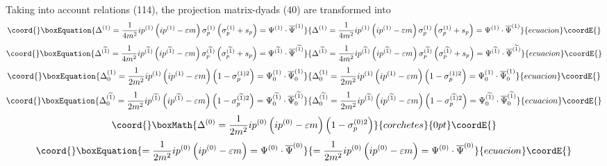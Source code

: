 \documentclass[a4paper,12pt]{article}
\begin{document}
Taking into account relations (114), the projection matrix-dyads (40) are
transformed into
\begin{equation}\coord{}\boxEquation{
\Delta ^{(1)}=\frac 1{4m^2}ip^{(1)}\left( ip^{(1)}-\varepsilon
m\right) \sigma _p^{(1)}\left( \sigma _p^{(1)}+s_p\right) =\Psi
^{(1)}\cdot \overline{ \Psi }^{(1)}  \label{116}
}{
\Delta ^{(1)}=\frac 1{4m^2}ip^{(1)}\left( ip^{(1)}-\varepsilon
m\right) \sigma _p^{(1)}\left( \sigma _p^{(1)}+s_p\right) =\Psi
^{(1)}\cdot \overline{ \Psi }^{(1)}  }{ecuacion}\coordE{}\end{equation}
\begin{equation}\coord{}\boxEquation{
\Delta ^{(\widetilde{1})}=\frac 1{4m^2}ip^{(\widetilde{1})}\left(
ip^{( \widetilde{1})}-\varepsilon m\right) \sigma
_p^{(\widetilde{1})}\left( \sigma _p^{(\widetilde{1})}+s_p\right)
=\Psi ^{(\widetilde{1})}\cdot \overline{\Psi }^{(\widetilde{1})}
\label{117}
}{
\Delta ^{(\widetilde{1})}=\frac 1{4m^2}ip^{(\widetilde{1})}\left(
ip^{( \widetilde{1})}-\varepsilon m\right) \sigma
_p^{(\widetilde{1})}\left( \sigma _p^{(\widetilde{1})}+s_p\right)
=\Psi ^{(\widetilde{1})}\cdot \overline{\Psi }^{(\widetilde{1})}
}{ecuacion}\coordE{}\end{equation}
\begin{equation}\coord{}\boxEquation{
\Delta _0^{(1)}=\frac 1{2m^2}ip^{(1)}\left( ip^{(1)}-\varepsilon m\right)
\left( 1-\sigma _p^{(1)2}\right) =\Psi _0^{(1)}\cdot \overline{\Psi }_0^{(1)}
\label{118}
}{
\Delta _0^{(1)}=\frac 1{2m^2}ip^{(1)}\left( ip^{(1)}-\varepsilon m\right)
\left( 1-\sigma _p^{(1)2}\right) =\Psi _0^{(1)}\cdot \overline{\Psi }_0^{(1)}
}{ecuacion}\coordE{}\end{equation}
\begin{equation}\coord{}\boxEquation{
\Delta _0^{(\widetilde{1})}=\frac
1{2m^2}ip^{(\widetilde{1})}\left( ip^{(
\widetilde{1})}-\varepsilon m\right) \left( 1-\sigma
_p^{(\widetilde{1} )2}\right) =\Psi _0^{(\widetilde{1})}\cdot
\overline{\Psi }_0^{(\widetilde{1} )}  \label{119}
}{
\Delta _0^{(\widetilde{1})}=\frac
1{2m^2}ip^{(\widetilde{1})}\left( ip^{(
\widetilde{1})}-\varepsilon m\right) \left( 1-\sigma
_p^{(\widetilde{1} )2}\right) =\Psi _0^{(\widetilde{1})}\cdot
\overline{\Psi }_0^{(\widetilde{1} )}  }{ecuacion}\coordE{}\end{equation}
\[\coord{}\boxMath{
\Delta ^{(0)}=\frac 1{2m^2}ip^{(0)}\left( ip^{(0)}-\varepsilon m\right)
\left( 1-\sigma _p^{(0)2}\right)
}{corchetes}{0pt}\coordE{}\]
\begin{equation}\coord{}\boxEquation{
=\frac 1{2m^2}ip^{(0)}\left( ip^{(0)}-\varepsilon m\right) =\Psi ^{(0)}\cdot
\overline{\Psi }^{(0)}  \label{120}
}{
=\frac 1{2m^2}ip^{(0)}\left( ip^{(0)}-\varepsilon m\right) =\Psi ^{(0)}\cdot
\overline{\Psi }^{(0)}  }{ecuacion}\coordE{}\end{equation}
\end{document}

